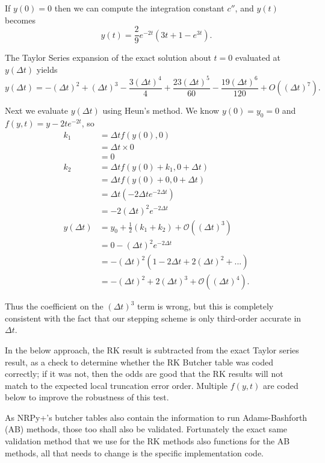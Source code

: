 \documentclass[landscape,letterpaper,10pt,english]{article}
\begin{document}
If \(y(0)=0\) then we can compute the integration constant \(c''\), and
\(y(t)\) becomes \[
y(t) = \frac{2}{9} e^{-2 t} \left(3 t + 1 - e^{3 t}\right).
\]

The Taylor Series expansion of the exact solution about \(t=0\)
evaluated at \(y(\Delta t)\) yields \[
y(\Delta t) = -(\Delta t)^2+(\Delta t)^3-\frac{3 (\Delta t)^4}{4}+\frac{23 (\Delta
  t)^5}{60}-\frac{19 (\Delta t)^6}{120}+O\left((\Delta t)^7\right).
\]

Next we evaluate \(y(\Delta t)\) using Heun's method. We know
\(y(0)=y_0=0\) and \(f(y,t)=y - 2 t e^{-2t}\), so \begin{align}
k_1 &= \Delta t f(y(0),0) \\
    &= \Delta t \times 0 \\
    &= 0 \\
k_2 &= \Delta t f(y(0)+k_1,0+\Delta t) \\
   &= \Delta t f(y(0)+0,0+\Delta t) \\
   &= \Delta t (-2 \Delta t e^{-2\Delta t}) \\
   &= -2 (\Delta t)^2 e^{-2\Delta t} \\
y(\Delta t) &= y_0 + \frac{1}{2} (k_1 + k_2) + \mathcal{O}\left((\Delta t)^3\right) \\
&= 0 - (\Delta t)^2 e^{-2\Delta t} \\
&= - (\Delta t)^2 ( 1 - 2 \Delta t + 2 (\Delta t)^2 + ...) \\
&= - (\Delta t)^2 + 2 (\Delta t)^3 + \mathcal{O}\left((\Delta t)^4\right).
\end{align}

Thus the coefficient on the \((\Delta t)^3\) term is wrong, but this is
completely consistent with the fact that our stepping scheme is only
third-order accurate in \(\Delta t\).

In the below approach, the RK result is subtracted from the exact Taylor
series result, as a check to determine whether the RK Butcher table was
coded correctly; if it was not, then the odds are good that the RK
results will not match to the expected local truncation error order.
Multiple \(f(y,t)\) are coded below to improve the robustness of this
test.

As NRPy+'s butcher tables also contain the information to run
Adams-Bashforth (AB) methods, those too shall also be validated.
Fortunately the exact same validation method that we use for the RK
methods also functions for the AB methods, all that needs to change is
the specific implementation code.
\end{document}
